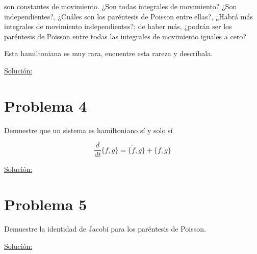 \documentclass[a4paper,10pt]{article}
\numberwithin{equation}{section}
\begin{document}
son constantes de movimiento. ¿Son todas integrales de movimiento? ¿Son independientes?, 
¿Cuáles son los paréntesis de Poisson entre ellas?, ¿Habrá más integrales de movimiento 
independientes?; de haber más, ¿podrán ser los paréntesis de Poisson entre todas 
las integrales de movimiento iguales a cero?

\vspace{.3cm}

Esta hamiltoniana es muy rara, encuentre esta rareza y descríbala.

\vspace{.3cm}

\underline{Solución:} \vspace{.3cm}

\section{Problema 4}

Demuestre que un sistema es hamiltoniano sí y solo sí

$$
\frac{d}{dt}\{f,g\} = \{\dot{f},g\} + \{f,\dot{g}\}
$$

\vspace{.3cm}

\underline{Solución:} \vspace{.3cm}

\section{Problema 5}

Demuestre la identidad de Jacobi para los paréntesis de Poisson.

\vspace{.3cm}

\underline{Solución:} \vspace{.3cm}
\end{document}
